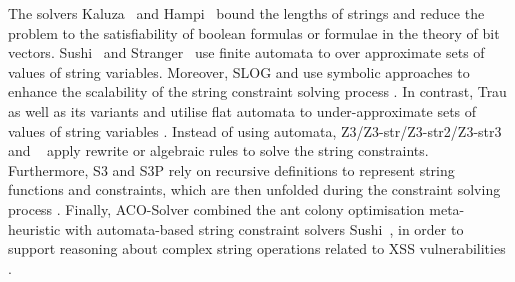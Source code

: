 {The solvers Kaluza~\cite{Berkeley-JavaScript} and Hampi~\cite{HAMPI}  bound the lengths of strings and reduce the problem to the satisfiability of boolean formulas or formulae in the theory of bit vectors. Sushi~\cite{sushi} and Stranger~\cite{YABI14,Stranger} use finite automata to over approximate sets of values of string variables. Moreover, SLOG and {\slent}  use symbolic approaches to enhance the scalability of the string constraint solving process \cite{fang-yu-circuits,WC+18}. In contrast, Trau as well as its variants {\zthreetrau} and {\trauplus} utilise flat automata to under-approximate sets of values of string variables \cite{Abdulla17,AbdullaACDHRR18-trau,AbdullaA+19,Z3-trau}.
%
Instead of using automata, Z3/Z3-str/Z3-str2/Z3-str3~\cite{BTV09,Z3,Z3-str,Z3-str2,Z3-str3} and {\cvc}~\cite{cvc4,ReynoldsWBBLT17} apply rewrite or algebraic rules to solve the string constraints.
%
Furthermore, S3 and S3P rely on recursive definitions to represent string functions and constraints, which are then unfolded during the constraint solving process \cite{S3,TCJ16}.
%
Finally, ACO-Solver combined the ant colony optimisation meta-heuristic with automata-based string constraint solvers Sushi~\cite{sushi},  in order to support reasoning about complex string operations related to XSS vulnerabilities \cite{ThomeSBB17}.
%
}

